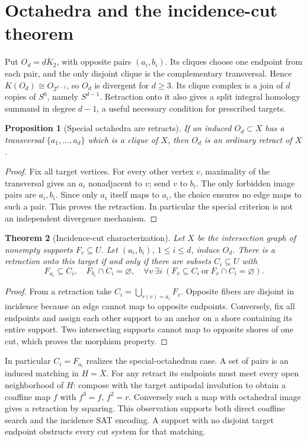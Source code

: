\documentclass[11pt,a4paper]{article}
\newtheorem{theorem}{Theorem}[section]
\newtheorem{proposition}[theorem]{Proposition}
\theoremstyle{definition}\newtheorem{definition}[theorem]{Definition}\newtheorem{example}[theorem]{Example}
\theoremstyle{remark}\newtheorem{remark}[theorem]{Remark}
\begin{document}
\section{Octahedra and the incidence-cut theorem}\label{sec:cuts}
Put \(O_d=\overline{dK_2}\), with opposite pairs \((a_i,b_i)\). Its cliques choose one endpoint from each pair, and the only disjoint clique is the complementary transversal. Hence \(K(O_d)\cong O_{2^{d-1}}\), so \(O_d\) is divergent for \(d\ge3\). Its clique complex is a join of \(d\) copies of \(S^0\), namely \(S^{d-1}\). Retraction onto it also gives a split integral homology summand in degree \(d-1\), a useful necessary condition for prescribed targets.
\begin{proposition}[Special octahedra are retracts]\label{prop:special}
If an induced \(O_d\subset X\) has a transversal \(\{a_1,\ldots,a_d\}\) which is a clique of \(X\), then \(O_d\) is an ordinary retract of \(X\).
\end{proposition}
\begin{proof}
Fix all target vertices. For every other vertex \(v\), maximality of the transversal gives an \(a_i\) nonadjacent to \(v\); send \(v\) to \(b_i\). The only forbidden image pairs are \(a_i,b_i\). Since only \(a_i\) itself maps to \(a_i\), the choice ensures no edge maps to such a pair. This proves the retraction. In particular the special criterion is not an independent divergence mechanism.
\end{proof}
\begin{theorem}[Incidence-cut characterization]\label{thm:cut}
Let \(X\) be the intersection graph of nonempty supports \(F_v\subseteq U\). Let \((a_i,b_i)\), \(1\le i\le d\), induce \(O_d\). There is a retraction onto this target if and only if there are subsets \(C_i\subseteq U\) with
\[
 F_{a_i}\subseteq C_i,\quad F_{b_i}\cap C_i=\varnothing,\quad
 \forall v\ \exists i\ (F_v\subseteq C_i\ \text{or}\ F_v\cap C_i=\varnothing).
\]
\end{theorem}
\begin{proof}
From a retraction take \(C_i=\bigcup_{r(v)=a_i}F_v\). Opposite fibers are disjoint in incidence because an edge cannot map to opposite endpoints. Conversely, fix all endpoints and assign each other support to an anchor on a shore containing its entire support. Two intersecting supports cannot map to opposite shores of one cut, which proves the morphism property.
\end{proof}
In particular \(C_i=F_{a_i}\) realizes the special-octahedron case. A set of pairs is an induced matching in \(H=\overline X\). For any retract its endpoints must meet every open neighborhood of \(H\): compose with the target antipodal involution to obtain a coaffine map \(f\) with \(f^3=f\), \(f^2=r\). Conversely such a map with octahedral image gives a retraction by squaring. This observation supports both direct coaffine search and the incidence SAT encoding. A support with no disjoint target endpoint obstructs every cut system for that matching.
\end{document}
